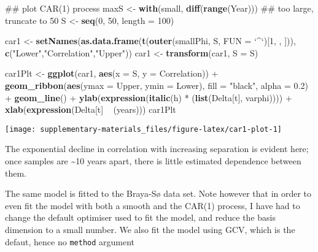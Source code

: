 \documentclass[12pt,]{article}
\newenvironment{Shaded}{\begin{snugshade}}{\end{snugshade}}
\newcommand{\KeywordTok}[1]{\textcolor[rgb]{0.13,0.29,0.53}{\textbf{{#1}}}}
\newcommand{\DataTypeTok}[1]{\textcolor[rgb]{0.13,0.29,0.53}{{#1}}}
\newcommand{\DecValTok}[1]{\textcolor[rgb]{0.00,0.00,0.81}{{#1}}}
\newcommand{\FloatTok}[1]{\textcolor[rgb]{0.00,0.00,0.81}{{#1}}}
\newcommand{\StringTok}[1]{\textcolor[rgb]{0.31,0.60,0.02}{{#1}}}
\newcommand{\NormalTok}[1]{{#1}}
\begin{document}
\begin{Shaded}
\begin{Highlighting}[]
\NormalTok{## plot CAR(1) process}
\NormalTok{maxS <-}\StringTok{ }\KeywordTok{with}\NormalTok{(small, }\KeywordTok{diff}\NormalTok{(}\KeywordTok{range}\NormalTok{(Year))) ## too large, truncate to 50}
\NormalTok{S <-}\StringTok{ }\KeywordTok{seq}\NormalTok{(}\DecValTok{0}\NormalTok{, }\DecValTok{50}\NormalTok{, }\DataTypeTok{length =} \DecValTok{100}\NormalTok{)}

\NormalTok{car1 <-}\StringTok{ }\KeywordTok{setNames}\NormalTok{(}\KeywordTok{as.data.frame}\NormalTok{(}\KeywordTok{t}\NormalTok{(}\KeywordTok{outer}\NormalTok{(smallPhi, S, }\DataTypeTok{FUN =} \StringTok{`}\DataTypeTok{^}\StringTok{`}\NormalTok{)[}\DecValTok{1}\NormalTok{, , ])),}
                 \KeywordTok{c}\NormalTok{(}\StringTok{"Lower"}\NormalTok{,}\StringTok{"Correlation"}\NormalTok{,}\StringTok{"Upper"}\NormalTok{))}
\NormalTok{car1 <-}\StringTok{ }\KeywordTok{transform}\NormalTok{(car1, }\DataTypeTok{S =} \NormalTok{S)}

\NormalTok{car1Plt <-}\StringTok{ }\KeywordTok{ggplot}\NormalTok{(car1, }\KeywordTok{aes}\NormalTok{(}\DataTypeTok{x =} \NormalTok{S, }\DataTypeTok{y =} \NormalTok{Correlation)) +}
\StringTok{    }\KeywordTok{geom_ribbon}\NormalTok{(}\KeywordTok{aes}\NormalTok{(}\DataTypeTok{ymax =} \NormalTok{Upper, }\DataTypeTok{ymin =} \NormalTok{Lower),}
                \DataTypeTok{fill =} \StringTok{"black"}\NormalTok{, }\DataTypeTok{alpha =} \FloatTok{0.2}\NormalTok{) +}
\StringTok{    }\KeywordTok{geom_line}\NormalTok{() +}
\StringTok{    }\KeywordTok{ylab}\NormalTok{(}\KeywordTok{expression}\NormalTok{(}\KeywordTok{italic}\NormalTok{(h) *}\StringTok{ }\NormalTok{(}\KeywordTok{list}\NormalTok{(Delta[t], varphi)))) +}
\StringTok{    }\KeywordTok{xlab}\NormalTok{(}\KeywordTok{expression}\NormalTok{(Delta[t] ~}\StringTok{ }\NormalTok{(years)))}
\NormalTok{car1Plt}
\end{Highlighting}
\end{Shaded}

\begin{center}\texttt{[image: supplementary-materials\_files/figure-latex/car1-plot-1]} \end{center}

The exponential decline in correlation with increasing separation is
evident here; once samples are \textasciitilde{}10 years apart, there is
little estimated dependence between them.

The same model is fitted to the Braya-Sø data set. Note however that in
order to even fit the model with both a smooth and the CAR(1) process, I
have had to change the default optimiser used to fit the model, and
reduce the basis dimension to a small number. We also fit the model
using GCV, which is the defaut, hence no \texttt{method} argument
\end{document}
